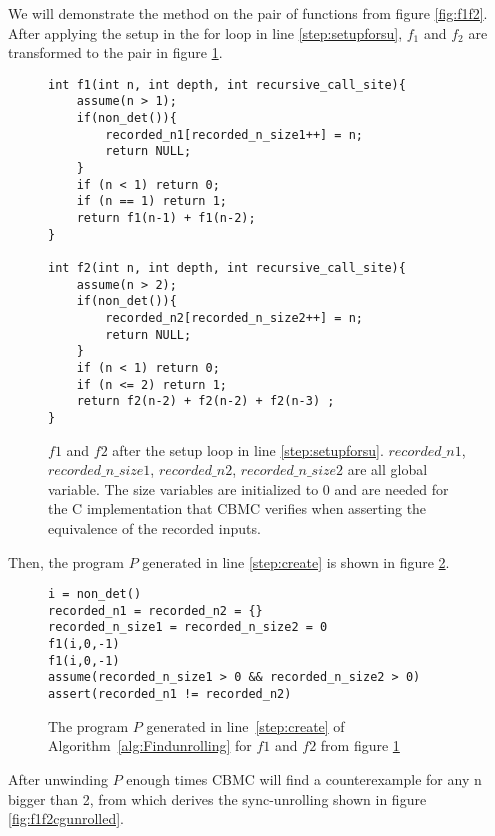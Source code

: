 We will demonstrate the method on the pair of functions from figure \ref{fig:f1f2}. After applying the setup in the for loop in line \ref{step:setupforsu}, $f_1$ and $f_2$ are transformed to the pair in figure \ref{fig:f1f2susetup}.
\begin{figure}[h]
\begin{center}
\begin{lstlisting}
int f1(int n, int depth, int recursive_call_site){
    assume(n > 1);
    if(non_det()){
        recorded_n1[recorded_n_size1++] = n;
        return NULL;
    }
    if (n < 1) return 0;
    if (n == 1) return 1; 
    return f1(n-1) + f1(n-2);
}

int f2(int n, int depth, int recursive_call_site){
    assume(n > 2);
    if(non_det()){
        recorded_n2[recorded_n_size2++] = n;
        return NULL;
    }
    if (n < 1) return 0;
    if (n <= 2) return 1;
    return f2(n-2) + f2(n-2) + f2(n-3) ;
}
\end{lstlisting}
\caption{$f1$ and $f2$ after the setup loop in line \ref{step:setupforsu}. $recorded\_n1$, $recorded\_n\_size1$, $recorded\_n2$, $recorded\_n\_size2$ are all global variable. The size variables are initialized to 0 and are needed for the C implementation that CBMC verifies when asserting the equivalence of the recorded inputs.}
\label{fig:f1f2susetup}
\end{center}
\end{figure}
%
Then, the program $P$ generated in line \ref{step:create} is shown in figure \ref{fig:findcutverfprogramf1f2}.
\begin{figure} [h]
\begin{center}
\begin{minipage}{7 cm}
\begin{lstlisting}
i = non_det()
recorded_n1 = recorded_n2 = {}
recorded_n_size1 = recorded_n_size2 = 0
f1(i,0,-1)
f1(i,0,-1)
assume(recorded_n_size1 > 0 && recorded_n_size2 > 0)
assert(recorded_n1 != recorded_n2)
\end{lstlisting}
\end{minipage}
\caption{The program $P$ generated in line~\ref{step:create} of Algorithm~\ref{alg:Findunrolling} for $f1$ and $f2$ from figure \ref{fig:f1f2susetup}}
\label{fig:findcutverfprogramf1f2}
\end{center}
\end{figure}
%
After unwinding $P$ enough times CBMC will find a counterexample for any n bigger than 2, from which  derives the sync-unrolling shown in figure \ref{fig:f1f2cgunrolled}.


